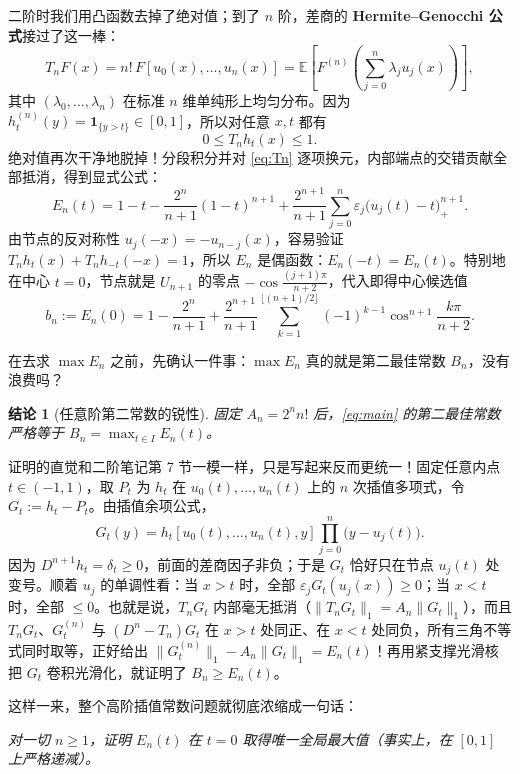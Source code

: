 \documentclass[UTF8,fontset=windows,a4paper,11pt]{ctexart}
\newcommand{\E}{\mathbb{E}}
\newcommand{\Lone}[1]{\lVert #1\rVert_1}
\newtheorem{claim}{结论}
\begin{document}
二阶时我们用凸函数去掉了绝对值；到了 $n$ 阶，差商的 \textbf{Hermite--Genocchi 公式}接过了这一棒：
\[
    T_n F(x) = n!\,F[u_0(x),\dots,u_n(x)]
    = \E\left[F^{(n)}\!\left(\sum_{j=0}^{n}\lambda_j u_j(x)\right)\right],
\]
其中 $(\lambda_0,\dots,\lambda_n)$ 在标准 $n$ 维单纯形上均匀分布。因为 $h_t^{(n)}(y)=\mathbf{1}_{\{y>t\}}\in[0,1]$，所以对任意 $x,t$ 都有
\[
    0\le T_n h_t(x)\le 1.
\]
绝对值再次干净地脱掉！分段积分并对 \eqref{eq:Tn} 逐项换元，内部端点的交错贡献全部抵消，得到显式公式：
\begin{equation}
    E_n(t) = 1 - t - \frac{2^n}{n+1}(1-t)^{n+1}
    + \frac{2^{n+1}}{n+1}\sum_{j=0}^{n}\varepsilon_j\bigl(u_j(t)-t\bigr)_+^{n+1}.
    \label{eq:En}
\end{equation}
由节点的反对称性 $u_j(-x)=-u_{n-j}(x)$，容易验证 $T_n h_t(x)+T_n h_{-t}(-x)=1$，所以 $E_n$ 是偶函数：$E_n(-t)=E_n(t)$。特别地在中心 $t=0$，节点就是 $U_{n+1}$ 的零点 $-\cos\frac{(j+1)\pi}{n+2}$，代入即得中心候选值
\begin{equation}
    b_n := E_n(0)
    = 1 - \frac{2^n}{n+1} + \frac{2^{n+1}}{n+1}\sum_{k=1}^{\lfloor(n+1)/2\rfloor}(-1)^{k-1}\cos^{n+1}\frac{k\pi}{n+2}.
    \label{eq:bn}
\end{equation}

在去求 $\max E_n$ 之前，先确认一件事：$\max E_n$ 真的就是第二最佳常数 $B_n$，没有浪费吗？

\begin{claim}[任意阶第二常数的锐性]
    \label{clm:sharp}
    固定 $A_n=2^n n!$ 后，\eqref{eq:main} 的第二最佳常数严格等于 $B_n=\max_{t\in I}E_n(t)$。
\end{claim}

证明的直觉和二阶笔记第 7 节一模一样，只是写起来反而更统一！固定任意内点 $t\in(-1,1)$，取 $P_t$ 为 $h_t$ 在 $u_0(t),\dots,u_n(t)$ 上的 $n$ 次插值多项式，令 $G_t:=h_t-P_t$。由插值余项公式，
\[
    G_t(y) = h_t[u_0(t),\dots,u_n(t),y]\prod_{j=0}^{n}\bigl(y-u_j(t)\bigr).
\]
因为 $D^{n+1}h_t=\delta_t\ge 0$，前面的差商因子非负；于是 $G_t$ 恰好只在节点 $u_j(t)$ 处变号。顺着 $u_j$ 的单调性看：当 $x>t$ 时，全部 $\varepsilon_j G_t(u_j(x))\ge 0$；当 $x<t$ 时，全部 $\le 0$。也就是说，$T_n G_t$ 内部毫无抵消（$\Lone{T_n G_t}=A_n\Lone{G_t}$），而且 $T_n G_t$、$G_t^{(n)}$ 与 $(D^n-T_n)G_t$ 在 $x>t$ 处同正、在 $x<t$ 处同负，所有三角不等式同时取等，正好给出 $\Lone{G_t^{(n)}}-A_n\Lone{G_t}=E_n(t)$！再用紧支撑光滑核把 $G_t$ 卷积光滑化，就证明了 $B_n\ge E_n(t)$。

这样一来，整个高阶插值常数问题就彻底浓缩成一句话：
\begin{center}
    \emph{对一切 $n\ge 1$，证明 $E_n(t)$ 在 $t=0$ 取得唯一全局最大值（事实上，在 $[0,1]$ 上严格递减）。}
\end{center}
\end{document}
